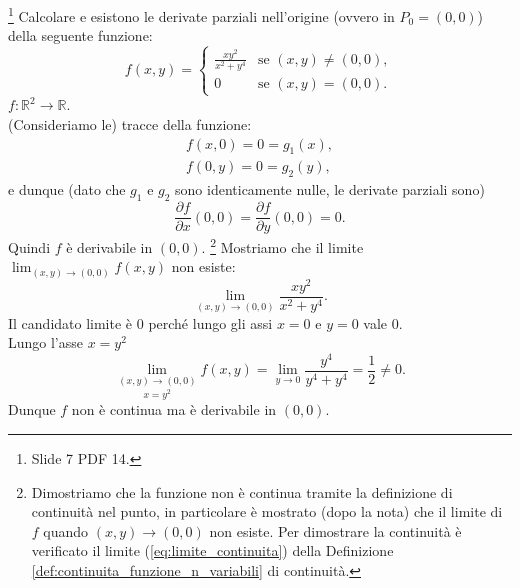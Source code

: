 \begin{example}\footnote{Slide 7 PDF 14.}
    Calcolare e esistono le derivate parziali nell'origine (ovvero in $P_0=(0,0)$) della seguente funzione:
    \begin{equation*}
        f(x,y)=
        \begin{cases}
            \frac{xy^2}{x^2+y^4} & \text{se } (x,y)\neq (0,0),\\
            0 & \text{se } (x,y)=(0,0).
        \end{cases}
    \end{equation*}
    $f:\mathbb R^2\rightarrow\mathbb R$.\\
    (Consideriamo le) tracce della funzione:
    \begin{equation*}
        \begin{matrix}
            f(x,0)=0=g_1(x),\\
            f(0,y)=0=g_2(y),
        \end{matrix}
    \end{equation*}
    e dunque (dato che $g_1$ e $g_2$ sono identicamente nulle, le derivate parziali sono)
    \begin{equation*}
        \frac{\partial f}{\partial x}(0,0)=\frac{\partial f}{\partial y}(0,0)=0.
    \end{equation*}
    Quindi $f$ è derivabile in $(0,0)$. \footnote{Dimostriamo che la funzione non è continua tramite la definizione di continuità nel punto, in particolare è mostrato (dopo la nota) che il limite di $f$ quando $(x,y)\rightarrow (0,0)$ non esiste. Per dimostrare la continuità è verificato il limite (\ref{eq:limite_continuita}) della Definizione \ref{def:continuita_funzione_n_variabili} di continuità.} Mostriamo che il limite $\lim_{(x,y)\rightarrow(0,0)}f(x,y)$ non esiste:
    \begin{equation*}
        \lim_{(x,y)\rightarrow(0,0)}\frac{xy^2}{x^2+y^4}.
    \end{equation*}
    Il candidato limite è 0 perché lungo gli assi $x=0$ e $y=0$ vale 0.\\
    Lungo l'asse $x=y^2$
    \begin{equation*}
        \underset{x=y^2}{\lim_{(x,y)\rightarrow(0,0)}}f(x,y)=\lim_{y\rightarrow 0}\frac{y^4}{y^4+y^4}=\frac{1}{2}\neq 0.
    \end{equation*}
    Dunque $f$ non è continua ma è derivabile in $(0,0)$.
\end{example}

